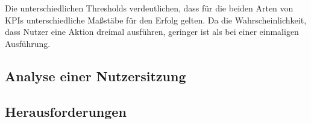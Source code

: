 Die unterschiedlichen Thresholds verdeutlichen, dass für die beiden Arten von KPIs unterschiedliche Maßstäbe für den Erfolg gelten. Da die Wahrscheinlichkeit, dass Nutzer eine Aktion dreimal ausführen, geringer ist als bei einer einmaligen Ausführung.



\subsection{Analyse einer Nutzersitzung}

\subsection{Herausforderungen}